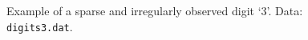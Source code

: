 \begin{figure}
  \centering
  \begin{subfigure}{.48\textwidth}
    \centering
  \end{subfigure}\hfill%
  \begin{subfigure}{.48\textwidth}
    \centering
    \begin{subfigure}{\textwidth}
      \centering
    \end{subfigure}
    \begin{subfigure}{\textwidth}
      \centering
    \end{subfigure}
  \end{subfigure}
  \caption{Example of a sparse and irregularly observed digit \enquote*{3}. Data: \texttt{digits3.dat}.}
  \label{fig:3-disc}
\end{figure}

